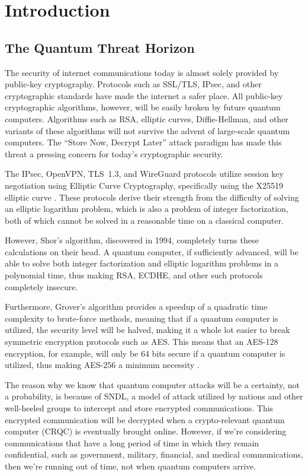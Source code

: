 \documentclass[10pt, conference, letterpaper]{IEEEtran}
\begin{document}
\section{Introduction}

\subsection{The Quantum Threat Horizon}
The security of internet communications today is almost solely provided by public-key cryptography. Protocols such as SSL/TLS, IPsec, and other cryptographic standards have made the internet a safer place. All public-key cryptographic algorithms, however, will be easily broken by future quantum computers. Algorithms such as RSA, elliptic curves, Diffie-Hellman, and other variants of these algorithms will not survive the advent of large-scale quantum computers. The ``Store Now, Decrypt Later'' attack paradigm has made this threat a pressing concern for today's cryptographic security.

The IPsec, OpenVPN, TLS~1.3, and WireGuard protocols utilize session key negotiation using Elliptic Curve Cryptography, specifically using the X25519 elliptic curve \cite{hulsing2017pqwireguard}. These protocols derive their strength from the difficulty of solving an elliptic logarithm problem, which is also a problem of integer factorization, both of which cannot be solved in a reasonable time on a classical computer.

However, Shor's algorithm, discovered in 1994, completely turns these calculations on their head. A quantum computer, if sufficiently advanced, will be able to solve both integer factorization and elliptic logarithm problems in a polynomial time, thus making RSA, ECDHE, and other such protocols completely insecure.

Furthermore, Grover's algorithm provides a speedup of a quadratic time complexity to brute-force methods, meaning that if a quantum computer is utilized, the security level will be halved, making it a whole lot easier to break symmetric encryption protocols such as AES. This means that an AES-128 encryption, for example, will only be 64 bits secure if a quantum computer is utilized, thus making AES-256 a minimum necessity \cite{shim2025qtrustnet}.

The reason why we know that quantum computer attacks will be a certainty, not a probability, is because of SNDL, a model of attack utilized by nations and other well-heeled groups to intercept and store encrypted communications. This encrypted communication will be decrypted when a crypto-relevant quantum computer (CRQC) is eventually brought online. However, if we're considering communications that have a long period of time in which they remain confidential, such as government, military, financial, and medical communications, then we're running out of time, not when quantum computers arrive.
\end{document}
